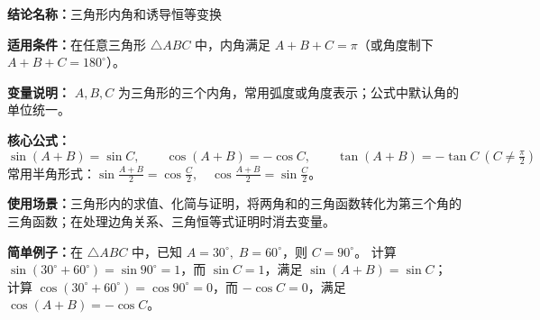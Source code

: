 \textbf{结论名称：}三角形内角和诱导恒等变换

\textbf{适用条件：}在任意三角形 \( \triangle ABC \) 中，内角满足 \( A+B+C=\pi \)（或角度制下 \( A+B+C=180^\circ \)）。

\textbf{变量说明：} \( A, B, C \) 为三角形的三个内角，常用弧度或角度表示；公式中默认角的单位统一。

\textbf{核心公式：}
\[
\boxed{\sin(A+B)=\sin C,\qquad \cos(A+B)=-\cos C,\qquad \tan(A+B)=-\tan C\ (C\neq\tfrac{\pi}{2})}
\]
常用半角形式：\(\displaystyle \sin\frac{A+B}{2}=\cos\frac{C}{2},\quad \cos\frac{A+B}{2}=\sin\frac{C}{2}\)。

\textbf{使用场景：}三角形内的求值、化简与证明，将两角和的三角函数转化为第三个角的三角函数；在处理边角关系、三角恒等式证明时消去变量。

\textbf{简单例子：}在 \( \triangle ABC \) 中，已知 \( A=30^\circ,\; B=60^\circ \)，则 \( C=90^\circ \)。  
计算 \(\sin(30^\circ+60^\circ)=\sin 90^\circ=1\)，而 \(\sin C=1\)，满足 \(\sin(A+B)=\sin C\)；  
计算 \(\cos(30^\circ+60^\circ)=\cos 90^\circ=0\)，而 \(-\cos C=0\)，满足 \(\cos(A+B)=-\cos C\)。